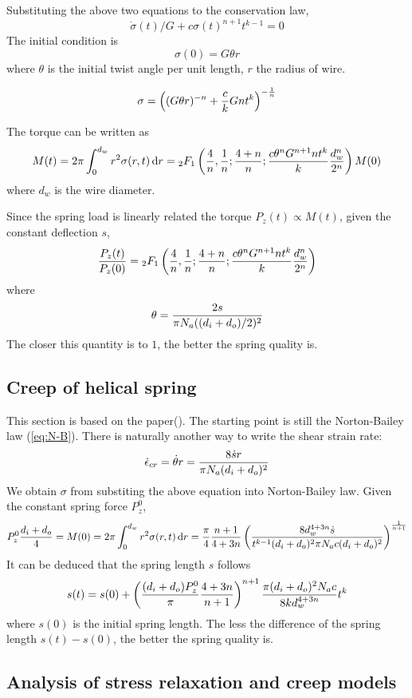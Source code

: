 \documentclass[10pt]{article}
\begin{document}
Substituting the above two equations to the conservation law,
\begin{equation} \label{eq:diff}
\dot{\sigma}(t)/G+c\sigma(t)^{n+1} t^{k-1}=0
\end{equation}
The initial condition is
\[
\sigma (0) = G\theta r
\]
where $\theta$ is the initial twist angle per unit length, $r$ the radius of wire.

\[
\sigma = \left( (G\theta r)^{-n} + {c\over k} Gnt^k \right)^{-{1\over n}}
\]

The torque can be written as
\[
M(t) = 2\pi \int_0^{d_w} r^2 \sigma(r,t)\,\mathrm{d} r ={}_{2}F_1 \left( {4\over n},{1\over n};{4+n\over n};{c\theta^n G^{n+1} n t^k\over k} {d_w^n\over 2^n}\right) M(0)
\]
where $d_w$ is the wire diameter.

Since the spring load is linearly related the torque $P_z(t)\propto M(t)$, given the constant deflection $s$,
\[
{P_z(t)\over P_z(0)} = {}_{2}F_1 \left( {4\over n},{1\over n};{4+n\over n};{c\theta^n G^{n+1} n t^k\over k} {d_w^n\over 2^n}\right)
\]
where
\[
\theta = {2s\over \pi N_a ((d_i+d_o)/2)^2}
\]
The closer this quantity is to $1$, the better the spring quality is.

\subsection{Creep of helical spring}
This section is based on the paper(\cite{Relaxation3}). The starting point is still the Norton-Bailey law (\ref{eq:N-B}). There is naturally another way to write the shear strain rate:
\[
\dot{\epsilon}_{cr} = \dot{\theta} r = {8\dot{s} r\over \pi N_a (d_i+d_o)^2}
\]
We obtain $\sigma$ from substiting the above equation into Norton-Bailey law. Given the constant spring force $P_z^0$,
\[
P_z^0{d_i+d_o\over 4}=M(0)=2\pi\int_0^{d_w} r^2 \sigma(r,t)\,\mathrm{d} r
={\pi\over 4}{n+1\over 4+3n}\left( {8d_w^{4+3n}\dot{s} \over t^{k-1} (d_i+d_o)^2 \pi N_a c (d_i+d_o)^2} \right)^{{1\over n+1}}
\]
It can be deduced that the spring length $s$ follows
\[
s(t) = s(0) + \left( {(d_i+d_o)P_z^0\over \pi}{4+3n\over n+1} \right)^{n+1} {\pi (d_i+d_o)^2 N_a c\over 8kd_w^{4+3n}} t^k
\]
where $s(0)$ is the initial spring length. The less the difference of the spring length $s(t)-s(0)$, the better the spring quality is.
 
 \cite{Ch2000} \cite{Relaxation1} \cite{Relaxation2} \cite{Relaxation3} \cite{Creep} 
\subsection{Analysis of stress relaxation and creep models}
\label{sec:stressanalysis}




\vfill\pagebreak


	
	


\end{document}
